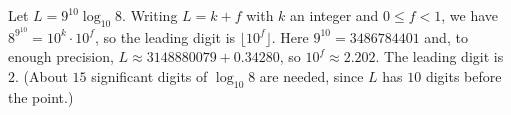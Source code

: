 Let $L=9^{10}\log_{10}8$. Writing $L=k+f$ with $k$ an integer and $0\le f<1$, we have $8^{9^{10}}=10^k\cdot10^f$, so the leading digit is $\lfloor10^f\rfloor$. Here $9^{10}=3486784401$ and, to enough precision, $L\approx3148880079+0.34280$, so $10^f\approx2.202$. The leading digit is $\boxed{2}$. (About $15$ significant digits of $\log_{10}8$ are needed, since $L$ has $10$ digits before the point.)
